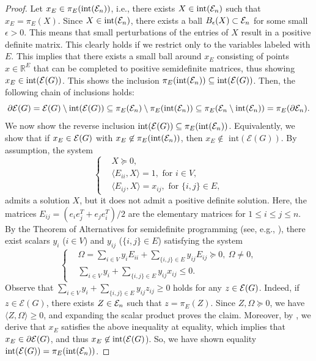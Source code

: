 \documentclass[a4paper, 11pt, twoside]{article}
\newcommand{\R}{\mathbb{R}}
\newcommand{\ME}{{\mathcal E}}
\theoremstyle{plain}
\begin{document}
\begin{proof}
 Let $x_E\in \pi_E( {\rm int}({\cal E}_n))$, i.e., there exists $X\in {\rm int}({\cal E}_n)$ such that $x_E=\pi_E(X)$. Since $ X\in {\rm int}({\cal E}_n)$, there exists a ball $B_{\epsilon}(X)\subset {\cal E}_n$ for some small $\epsilon>0$. 
    This means that small perturbations of the entries of $X$ result in a positive definite matrix. This clearly holds if we restrict only to the variables labeled with $E$. 
    This implies that there exists a small ball around $x_E$ consisting of points $x\in\R^E$  that can be completed to positive semidefinite matrices, thus showing $x_E\in {\rm int} ({\cal E}(G))$.
    This shows the inclusion $\pi_E( {\rm int}({\cal E}_n))\subseteq {\rm int} ({\cal E}(G))$. 
    Then, the following chain of inclusions holds:
    \[
    \partial{\cal E}(G) = {\cal E}(G)\setminus {\rm int}({\cal E}(G))\subseteq \pi_E({\cal E}_n)\setminus \pi_E( {\rm int}({\cal E}_n)) \subseteq \pi_E({\cal E}_n\setminus {\rm int}({\cal E}_n)) = \pi_E(\partial {\cal E}_n).
    \]
   We now show the reverse   inclusion ${\rm int} ({\cal E}(G)) \subseteq \pi_E( {\rm int}({\cal E}_n))$.
   Equivalently, we show that if $x_E\in {\cal E}(G)$ with $x_E \not\in \pi_E( {\rm int}({\cal E}_n))$, then $x_E\not\in \text{ int}(\ME(G))$.
    By assumption, the system 
    \[
    \label{eq:polysys}
    \left\{
    \begin{aligned}
    & X \succeq 0, \\
    & \langle E_{ii},X\rangle =1,  \text{ for } i\in V,\\
    & \langle E_{ij},X\rangle =x_{ij}, \text{ for }\{i,j\} \in E,
    \end{aligned}
    \right.
    \]
    admits a solution $X$, but it does not admit a positive definite solution. Here, the matrices $E_{ij}=(e_ie_j^T+e_je_i^T)/2$ are the elementary matrices for $1\le i\le j\le n$.
    By the Theorem of Alternatives for  semidefinite programming  (see, e.g., \cite[Lemma 3.6]{LV-MP-2014}), there exist scalars $ y_i$ ($i\in V$) and $y_{ij}$ ($\{i,j\}\in E$) satisfying the system
    \begin{equation}\label{eq:SDPalternatives}
    \left\{
    \begin{aligned}
    &  \Omega = \sum_{i\in V} y_i E_{ii}+\sum_{\{i,j\}\in E} y_{ij}E_{ij}\succeq 0, \ \Omega \ne 0,\\
    &\sum_{i\in V} y_i + \sum_{\{i,j\}\in E} y_{ij}x_{ij} \leq 0.
    \end{aligned}
    \right.
    \end{equation}
Observe that   $\sum_{i\in V} y_i + \sum_{\{i,j\}\in E} y_{ij} z_{ij} \geq 0$ holds for any $z\in {\cal E}(G)$. Indeed, if $z\in \ME(G)$, there exists $Z\in {\cal E}_n$ such that $z=\pi_E(Z)$. Since $Z,\Omega \succeq 0$, we have  $\langle Z,\Omega\rangle \geq 0$, and expanding the scalar product proves the claim. 
 Moreover,   by , we derive that $x_E$ satisfies the above inequality at equality, 
  which implies that $x_E \in \partial{\cal E}(G)$, and thus  $x_E \not\in {\rm int}({\cal E}(G)$). So, we have shown equality ${\rm int} ({\cal E}(G))=\pi_E({\rm int} ( {\cal E}_n))$.
\end{proof}
\end{document}
